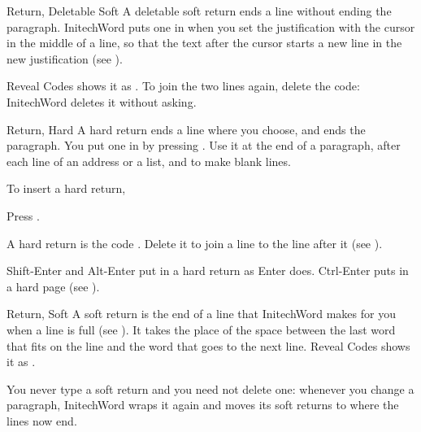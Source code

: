 \begin{Feature}{Return, Deletable Soft}
A deletable soft return ends a line without ending the paragraph.
InitechWord puts one in when you set the justification with the cursor in
the middle of a line, so that the text after the cursor starts a new line
in the new justification (see ).

Reveal Codes shows it as \Code{[DSRt]}.  To join the two lines again, delete
the code: InitechWord deletes it without asking.

\end{Feature}

\begin{Feature}{Return, Hard}
A hard return ends a line where you choose, and ends the paragraph.  You put
one in by pressing .  Use it at the end of a paragraph, after each
line of an address or a list, and to make blank lines.

To insert a hard return,
\begin{WPSteps}
\item Press .
\end{WPSteps}

\Notes
{}
A hard return is the code \Code{[HRt]}.  Delete it to join a line to the
line after it (see ).

Shift-Enter and Alt-Enter put in a hard return as Enter does.  Ctrl-Enter
puts in a hard page (see ).

\end{Feature}

\begin{Feature}{Return, Soft}
A soft return is the end of a line that InitechWord makes for you when a
line is full (see ).  It takes the place of the space
between the last word that fits on the line and the word that goes to the
next line.  Reveal Codes shows it as \Code{[SRt]}.

You never type a soft return and you need not delete one: whenever you
change a paragraph, InitechWord wraps it again and moves its soft returns to
where the lines now end.

\end{Feature}

